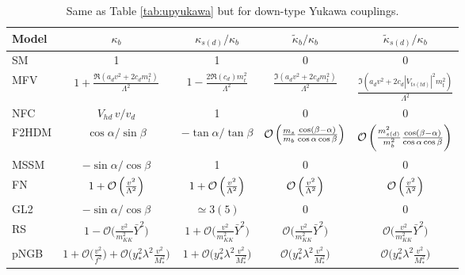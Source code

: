 \documentclass[../report.tex]{subfiles}
\begin{document}
\begin{table}[h]
\begin{center}
\begin{tabular}{ l   c  c c c}
\toprule[0.1em]
Model	& $\kappa_b$ & $\kappa_{s(d)}/\kappa_b$ & $\tilde \kappa_b/\kappa_b$ & $\tilde \kappa_{s(d)}/\kappa_b$ \\ \midrule[0.05em]
SM	& 1 & 1 &0 &0\\
MFV & $1+\frac{\Re(a_d v^2 +2 c_d m_t^2)}{\Lambda^2}$&$1-\frac{2\Re(c_d)m_t^2}{\Lambda^2}$&$ \frac{\Im(a_d v^2+2 c_d m_t^2)}{\Lambda^2}$&$ \frac{\Im(a_d v^2+2 c_d |V_{ts(td)}|^2 m_t^2)}{\Lambda^2}$ \\
NFC & $V_{hd}\,v/v_d$	& 1 &0 &0\\
F2HDM & $\cos\alpha/\sin\beta$	& $-\tan\alpha/\tan\beta$ & $\mathcal{O}\left(\frac{m_s}{m_b}\frac{\cos(\beta-\alpha)}{\cos\alpha\cos\beta}\right)$ & $\mathcal{O}\left(\frac{m_{s(d)}^2}{m_b^2} \frac{\cos(\beta-\alpha)}{\cos\alpha\cos\beta}\right)$ \\
MSSM	 & $-\sin\alpha/\cos\beta$	&1 &0 &0\\
FN & $1+\mathcal{O}\left(\frac{v^2}{\Lambda^2}\right)$ &
	$1+\mathcal{O}\left(\frac{v^2}{\Lambda^2}\right)$ &
	$\mathcal{O}\left(\frac{v^2}{\Lambda^2}\right)$ &
	$\mathcal{O}\left(\frac{v^2}{\Lambda^2}\right)$ \\
GL2	& $-\sin\alpha/\cos\beta$	& $\simeq 3(5)$ & 0 & 0 \\
RS &$1-{\mathcal O}\Big(\frac{ v^2}{m_{KK}^2}\bar Y^2\Big)$&$1+{\mathcal O}\Big(\frac{ v^2}{m_{KK}^2}\bar Y^2\Big)$ &${\mathcal O}\Big(\frac{ v^2}{m_{KK}^2}\bar Y^2\Big)$ &${\mathcal O}\Big(\frac{ v^2}{m_{KK}^2}\bar Y^2\Big)$ \\
pNGB & $1+{\mathcal O}\Big(\frac{ v^2}{f^2}\Big)+{\mathcal O}\Big(y_*^2 \lambda^2 \frac{ v^2}{M_*^2}\Big)$ & $1+{\mathcal O}\Big(y_*^2 \lambda^2 \frac{ v^2}{M_*^2}\Big)$ & ${\mathcal O}\Big(y_*^2 \lambda^2 \frac{ v^2}{M_*^2}\Big)$ & ${\mathcal O}\Big(y_*^2 \lambda^2 \frac{ v^2}{M_*^2}\Big)$\\
\bottomrule[0.1em]
\end{tabular}
\caption{Same as Table \ref{tab:upyukawa} but for down-type Yukawa
  couplings. 
}

\label{tab:downyukawa}
\end{center}
\end{table}
\end{document}
